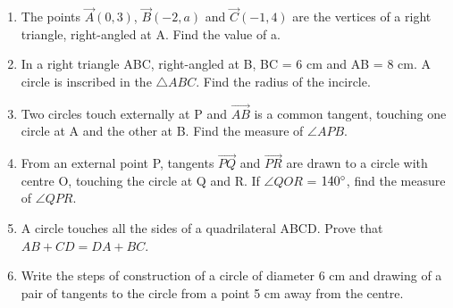 \documentclass{article}
\begin{document}
\begin{enumerate}
\item The points $\vec{A}(0, 3)$, $\vec{B}(-2, a)$ and $\vec{C}(-1, 4)$ are the vertices of a right triangle, right-angled at A. Find the value of a. 
		
\item In a right triangle ABC, right-angled at B, BC = 6 cm and AB = 8 cm. A circle is inscribed in the $\triangle ABC$. Find the radius of the incircle. 
			
\item Two circles touch externally at P and $ \vec{AB} $ is a common tangent, touching one circle at A and the other at B. Find the measure of $\angle APB$.

\item From an external point P, tangents $ \vec{PQ} $ and $ \vec{PR} $ are drawn to a circle with centre O, touching the circle at Q and R. If $\angle QOR$ = $140\degree$, find the measure of $\angle QPR$. 

\item A circle touches all the sides of a quadrilateral ABCD. Prove that $AB + CD = DA + BC$.

\item Write the steps of construction of a circle of diameter 6 cm and drawing of a pair of tangents to the circle from a point 5 cm away from the centre. 
		
\end{enumerate}	
\end{document}
